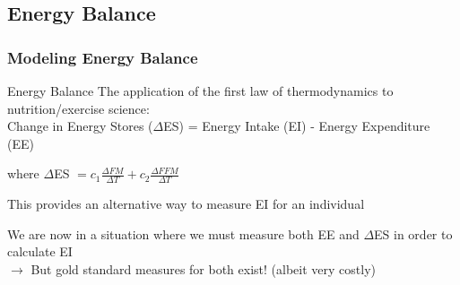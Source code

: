 \documentclass[handout]{beamer}\usepackage[]{graphicx}\usepackage[]{color}
\begin{document}
\subsection{Energy Balance}
\begin{frame}
\frametitle{Modeling Energy Balance}

\begin{block}{Energy Balance}
The application of the first law of thermodynamics to nutrition/exercise science: \\
Change in Energy Stores ($\Delta$ES) = Energy Intake (EI) - Energy Expenditure (EE)
\end{block}

where $\Delta$ES $= c_1 \frac{\Delta FM}{\Delta T } + c_2 \frac{\Delta FFM}{\Delta T}$  

\vspace{0.4cm}

This provides an alternative way to measure EI for an individual

\vspace{0.2cm}
We are now in a situation where we must measure both EE and $\Delta$ES in order to calculate EI \\
$\rightarrow$ But gold standard measures for both exist! (albeit very costly)

\end{frame}

% 
% 
% 
% 
% 
\end{document}

